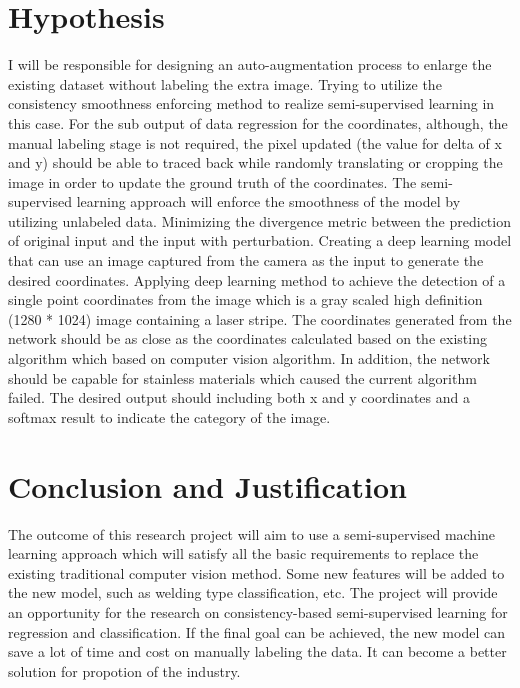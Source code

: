 \section{Hypothesis}
I will be responsible for designing an auto-augmentation process to enlarge the existing dataset without labeling the extra image. Trying to utilize the consistency smoothness enforcing 
\cite{NIPS2014_5487} \cite{DBLP:journals/corr/LaineA16} \cite{8417973} \cite{DBLP:journals/corr/abs-1809-08370} \cite{DBLP:journals/corr/TarvainenV17}  method 
to realize semi-supervised learning in this case. 
For the sub output of data regression for the coordinates, although, the manual labeling stage is not required, the pixel
 updated (the value for delta of x and y) should be able to traced back while randomly translating or cropping the image in order to 
 update the ground truth of the coordinates. The semi-supervised learning approach will enforce the smoothness of the model by utilizing unlabeled data. Minimizing the divergence metric between the prediction of original input and the input with perturbation. 
 Creating a deep learning model that can use an image captured from the camera as the input to generate the desired coordinates. 
 Applying deep learning method to achieve the detection of a single point coordinates from the image which
is a gray scaled high definition (1280 * 1024) image containing a laser stripe. 
The coordinates generated from the network should be as close as the coordinates calculated based on the 
existing algorithm which based on computer vision algorithm. In addition, the network should be capable
for stainless materials which caused the current algorithm failed. The desired output should including both x and y coordinates and a softmax result to indicate the category of the image. 

\section{Conclusion and Justification}
The outcome of this research project will aim to use a semi-supervised machine learning approach which will satisfy all the basic requirements to replace the existing traditional computer vision method. 
Some new features will be added to the new model, such as welding type classification, etc. The project will provide an opportunity for the research on consistency-based semi-supervised learning
for regression and classification. If the final goal can be achieved, the new model can save a lot of time and cost on manually labeling the data. It can become a better solution for propotion of the industry.

